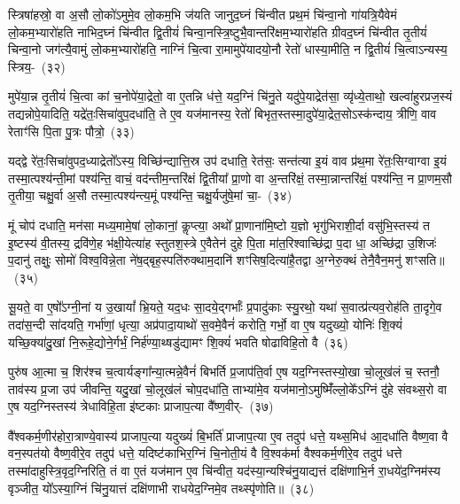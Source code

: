 स्त्रिषा॑हस्रो॒ वा अ॒सौ लो॒को॑\-ऽमुमे॒व लो॒कम॒भि ज॑यति जानुद॒घ्नं चि॑न्वीत प्रथ॒मं चि॑न्वा॒नो गा॑यत्रि॒यैवेमं लो॒कम॒भ्यारो॑हति नाभिद॒घ्नं चि॑न्वीत द्वि॒तीयं॑ चिन्वा॒नस्त्रि॒ष्टुभै॒वान्तरि॑क्षम॒\-भ्या\-रो॑हति ग्रीवद॒घ्नं चि॑न्वीत तृ॒तीयं॑ चिन्वा॒नो जग॑त्यै॒वामुं लो॒कम॒भ्यारो॑हति॒ नाग्निं चि॒त्वा रा॒मामुपे॑यादयो॒नौ रेतो॑ धास्या॒मीति॒ न द्वि॒तीयं॑ चि॒त्वा\-ऽन्यस्य॒ स्त्रिय॒-~(३२)\ip

मुपे॑या॒न्न तृ॒तीयं॑ चि॒त्वा कां च॒नोपे॑या॒द्रेतो॒ वा ए॒तन्नि ध॑त्ते॒ यद॒ग्निं चि॑नु॒ते यदु॑पे॒याद्रेत॑सा॒ व्यृ॑ध्ये॒ताथो॒ खल्वा॑हुरप्रज॒स्यं तद्यन्नोपे॒यादिति॒ यद्रे॑तः॒सिचा॑वुप॒\-दधा॑ति॒ ते ए॒व यज॑मानस्य॒ रेतो॑ बिभृत॒स्तस्मा॒दुपे॑या॒द्रेत॒सो\-ऽस्क॑न्दाय॒ त्रीणि॒ वाव रेताꣳ॑सि पि॒ता पु॒त्रः पौत्रो॒~(३३)\ip

यद्द्वे रे॑तः॒सिचा॑वुपद॒ध्याद्रेतो᳚\-ऽस्य॒ विच्छि॑न्द्यात्ति॒स्र उप॑ दधाति॒ रेत॑सः॒ सन्त॑त्या इ॒यं वाव प्र॑थ॒मा रे॑तः॒सिग्वाग्वा इ॒यं तस्मा॒त्पश्य॑न्ती॒मां पश्य॑न्ति॒ वाचं॒ वद॑न्तीम॒न्तरि॑क्षं द्वि॒तीया᳚ प्रा॒णो वा अ॒न्तरि॑क्षं॒ तस्मा॒न्नान्तरि॑क्षं॒ पश्य॑न्ति॒ न प्रा॒णम॒सौ तृ॒तीया॒ चक्षु॒र्वा अ॒सौ तस्मा॒त्पश्य॑न्त्य॒मूं पश्य॑न्ति॒ चक्षु॒र्यजु॑षे॒मां चा॒-~(३४)\ip

मूं चोप॑ दधाति॒ मन॑सा मध्य॒मामे॒षां लो॒कानां॒ कॢप्त्या॒ अथो᳚ प्रा॒णाना॑मि॒ष्टो य॒ज्ञो भृगु॑भिराशी॒र्दा वसु॑भि॒स्तस्य॑ त इ॒ष्टस्य॑ वी॒तस्य॒ द्रवि॑णे॒ह भ॑क्षी॒येत्या॑ह स्तुतश॒स्त्रे ए॒वैतेन॑ दुहे पि॒ता मा॑त॒रिश्वाच्छि॑द्रा प॒दा धा॒ अच्छि॑द्रा उ॒शिजः॑ प॒दानु॑ तक्षुः॒ सोमो॑ विश्व॒विन्ने॒ता ने॑ष॒द्बृह॒स्पति॑रुक्थाम॒दानि॑ शꣳसिष॒दित्या॑है॒तद्वा अ॒ग्नेरु॒क्थं तेनै॒वैन॒मनु॑ शꣳसति॥~(३५)\ip

{\anuvakamend[{मि॒नु॒यात्तृ॒तीयं॑ चिन्वा॒नस्त्रियं॒ पौत्र॑श्च॒ वै स॒प्तद॑श च}]}

सू॒यते॒ वा ए॒षो᳚\-ऽग्नी॒नां य उ॒खायां᳚ भ्रि॒यते॒ यद॒धः सा॒दये॒द्गर्भाः᳚ प्र॒पादु॑काः स्यु॒रथो॒ यथा॑ स॒वात्प्र॑त्यव॒रोह॑ति ता॒दृगे॒व तदा॑स॒न्दी सा॑दयति॒ गर्भा॑णां॒ धृत्या॒ अप्र॑पादा॒याथो॑ स॒वमे॒वैनं॑ करोति॒ गर्भो॒ वा ए॒ष यदुख्यो॒ योनिः॑ शि॒क्यं॑ यच्छि॒क्या॑दु॒खां नि॒रूहे॒द्योने॒र्गर्भं॒ निर्\mbox{}ह॑ण्या॒थ्षडु॑द्यामꣳ शि॒क्यं॑ भवति षोढाविहि॒तो वै~(३६)\ip

पुरु॑ष आ॒त्मा च॒ शिर॑श्च च॒त्वार्यङ्गा᳚न्या॒त्मन्ने॒वैनं॑ बिभर्ति प्र॒जा\-प॑ति॒र्वा ए॒ष यद॒ग्निस्तस्यो॒खा चो॒लूख॑लं च॒ स्तनौ॒ ताव॑स्य प्र॒जा उप॑ जीवन्ति॒ यदु॒खां चो॒लूख॑लं चोप॒\-दधा॑ति॒ ताभ्या॑मे॒व यज॑मानो॒\-ऽमुष्मिँ॑ल्लो॒के᳚\-ऽग्निं दु॑हे संवथ्स॒रो वा ए॒ष यद॒ग्निस्तस्य॑ त्रेधाविहि॒ता इ॑ष्टकाः प्राजाप॒त्या वै᳚ष्ण॒वीर्-~(३७)\ip

वै᳚श्वकर्म॒णीर॑होरा॒त्राण्ये॒वास्य॑ प्राजाप॒त्या यदुख्यं॑ बि॒भर्ति॑ प्राजाप॒त्या ए॒व तदुप॑ धत्ते॒ यथ्स॒मिध॑ आ॒दधा॑ति वैष्ण॒वा वै वन॒स्पत॑यो वैष्ण॒वीरे॒व तदुप॑ धत्ते॒ यदिष्ट॑काभिर॒ग्निं चि॒नोती॒यं वै वि॒श्वक॑र्मा वैश्वकर्म॒णीरे॒व तदुप॑ धत्ते तस्मा॑दाहुस्त्रि॒वृद॒ग्निरिति॒ तं वा ए॒तं यज॑मान ए॒व चि॑न्वीत॒ यद॑स्या॒न्यश्चि॑नु॒याद्यत्तं दक्षि॑णाभि॒र्न रा॒धये॑द॒ग्निम॑स्य वृञ्जीत॒ यो᳚\-ऽस्या॒ग्निं चि॑नु॒यात्तं दक्षि॑णाभी राधयेद॒ग्निमे॒व तथ्स्पृ॑णोति॥~(३८)\ip


